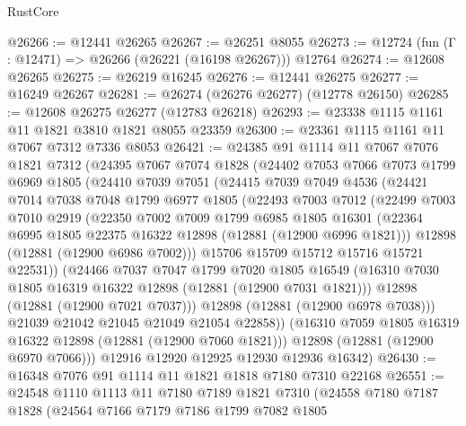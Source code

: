 \begin{lexlean}{RustCore}
\begin{coremodule}
@26266 := @12441 @26265
@26267 := @26251 @8055
@26273 := @12724 (fun (Γ : @12471) => @26266 (@26221 (@16198 @26267))) @12764
@26274 := @12608 @26265
@26275 := @26219 @16245
@26276 := @12441 @26275
@26277 := @16249 @26267
@26281 := @26274 (@26276 @26277) (@12778 @26150)
@26285 := @12608 @26275 @26277 (@12783 @26218)
@26293 := @23338 @1115 @1161 @11 @1821 @3810 @1821 @8055 @23359
@26300 := @23361 @1115 @1161 @11 @7067 @7312 @7336 @8053
@26421 := @24385
    @91
    @1114
    @11
    @7067
    @7076
    @1821
    @7312
    (@24395
      @7067
      @7074
      @1828
      (@24402
        @7053
        @7066
        @7073
        @1799
        @6969
        @1805
        (@24410
          @7039
          @7051
          (@24415
            @7039
            @7049
            @4536
            (@24421
              @7014
              @7038
              @7048
              @1799
              @6977
              @1805
              (@22493
                @7003
                @7012
                (@22499
                  @7003
                  @7010
                  @2919
                  (@22350
                    @7002
                    @7009
                    @1799
                    @6985
                    @1805
                    @16301
                    (@22364 @6995 @1805 @22375 @16322 @12898 (@12881 (@12900 @6996 @1821)))
                    @12898
                    (@12881 (@12900 @6986 @7002)))
                  @15706
                  @15709
                  @15712
                  @15716
                  @15721
                  @22531))
              (@24466
                @7037
                @7047
                @1799
                @7020
                @1805
                @16549
                (@16310 @7030 @1805 @16319 @16322 @12898 (@12881 (@12900 @7031 @1821)))
                @12898
                (@12881 (@12900 @7021 @7037)))
              @12898
              (@12881 (@12900 @6978 @7038)))
            @21039
            @21042
            @21045
            @21049
            @21054
            @22858))
        (@16310 @7059 @1805 @16319 @16322 @12898 (@12881 (@12900 @7060 @1821)))
        @12898
        (@12881 (@12900 @6970 @7066)))
      @12916
      @12920
      @12925
      @12930
      @12936
      @16342)
@26430 := @16348 @7076 @91 @1114 @11 @1821 @1818 @7180 @7310 @22168
@26551 := @24548
    @1110
    @1113
    @11
    @7180
    @7189
    @1821
    @7310
    (@24558
      @7180
      @7187
      @1828
      (@24564
        @7166
        @7179
        @7186
        @1799
        @7082
        @1805

\end{coremodule}
\end{lexlean}
